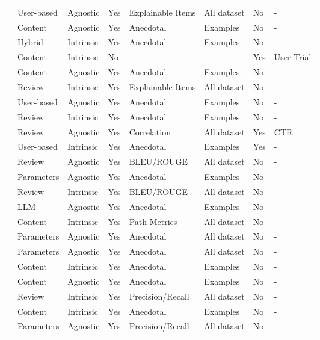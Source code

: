 \begin{tabular}{llllllll}
\cite{9260076} & User-based & Agnostic & Yes & Explainable Items & All dataset & No & - \\
\cite{10776491} & Content & Agnostic & Yes & Anecdotal & Examples & No & - \\
\cite{9005590} & Hybrid & Intrinsic & Yes & Anecdotal & Examples & No & - \\
\cite{10260804} & Content & Intrinsic & No & - & - & Yes & User Trial \\
\cite{10683822} & Content & Agnostic & Yes & Anecdotal & Examples & No & - \\
\cite{9079084} & Review & Intrinsic & Yes & Explainable Items & All dataset & No & - \\
\cite{9836983} & User-based & Agnostic & Yes & Anecdotal & Examples & No & - \\
\cite{10873804} & Review & Intrinsic & Yes & Anecdotal & Examples & No & - \\
\cite{8594883} & Review & Agnostic & Yes & Correlation & All dataset & Yes & CTR \\
\cite{10048787} & User-based & Intrinsic & Yes & Anecdotal & Examples & Yes & - \\
\cite{10446052} & Review & Agnostic & Yes & BLEU/ROUGE & All dataset & No & - \\
\cite{10827288} & Parameters & Agnostic & Yes & Anecdotal & Examples & No & - \\
\cite{9482221} & Review & Intrinsic & Yes & BLEU/ROUGE & All dataset & No & - \\
\cite{10658914} & LLM & Agnostic & Yes & Anecdotal & Examples & No & - \\
\cite{10334552} & Content & Intrinsic & Yes & Path Metrics & All dataset & No & - \\
\cite{10825771} & Parameters & Agnostic & Yes & Anecdotal & All dataset & No & - \\
\cite{10308154} & Parameters & Agnostic & Yes & Anecdotal & All dataset & No & - \\
\cite{10742303} & Content & Intrinsic & Yes & Anecdotal & Examples & No & - \\
\cite{10623784} & Content & Agnostic & Yes & Anecdotal & Examples & No & - \\
\cite{10884422} & Review & Intrinsic & Yes & Precision/Recall & All dataset & No & - \\
\cite{SHIMIZU2022107970} & Content & Intrinsic & Yes & Anecdotal & Examples & No & - \\
\cite{BRUNOT2022102021} & Parameters & Agnostic & Yes & Precision/Recall & All dataset & No & - \\

\end{tabular}
